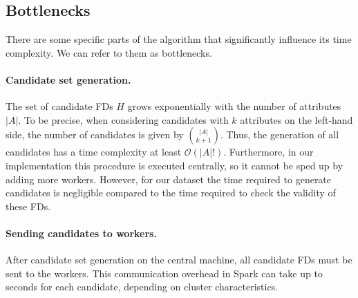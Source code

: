 \documentclass{article}
\begin{document}
    
    \subsection{Bottlenecks}\label{sec:bottlenecks}
    
        There are some specific parts of the algorithm that significantly influence its time complexity. We can refer to them as bottlenecks.
    
        \paragraph{Candidate set generation.}
        
        The set of candidate FDs $H$ grows exponentially with the number of attributes $|A|$. To be precise, when considering candidates with $k$ attributes on the left-hand side, the number of candidates is given by $\binom{|A|}{k+1}$. Thus, the generation of all candidates has a time complexity at least $\mathcal{O}(|A|!)$. Furthermore, in our implementation this procedure is executed centrally, so it cannot be sped up by adding more workers. However, for our dataset the time required to generate candidates is negligible compared to the time required to check the validity of these FDs.

        \paragraph{Sending candidates to workers.}
        
        After candidate set generation on the central machine, all candidate FDs must be sent to the workers. This communication overhead in Spark can take up to seconds for each candidate, depending on cluster characteristics.
        
        
\end{document}
